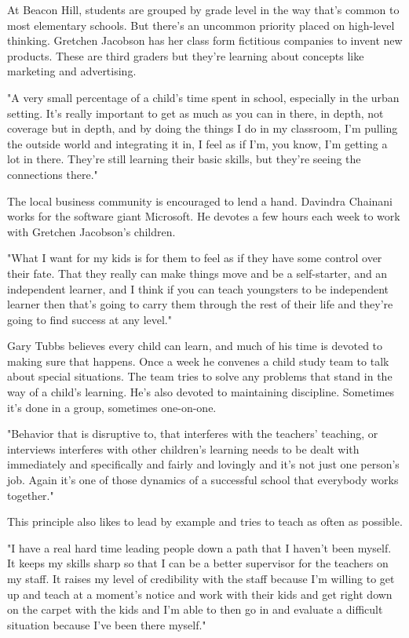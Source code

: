At Beacon Hill, students are grouped by grade level in the way that's common to most elementary schools. But there's an uncommon priority placed on high-level thinking. Gretchen Jacobson has her class form fictitious companies to invent new products. These are third graders but they're learning about concepts like marketing and advertising.

"A very small percentage of a child's time spent in school, especially in the urban setting. It's really important to get as much as you can in there, in depth, not coverage but in depth, and by doing the things I do in my classroom, I'm pulling the outside world and integrating it in, I feel as if I'm, you know, I'm getting a lot in there. They're still learning their basic skills, but they're seeing the connections there."

The local business community is encouraged to lend a hand. Davindra Chainani works for the software giant Microsoft. He devotes a few hours each week to work with Gretchen Jacobson's children.

"What I want for my kids is for them to feel as if they have some control over their fate. That they really can make things move and be a self-starter, and an independent learner, and I think if you can teach youngsters to be independent learner then that's going to carry them through the rest of their life and they're going to find success at any level."

Gary Tubbs believes every child can learn, and much of his time is devoted to making sure that happens. Once a week he convenes a child study team to talk about special situations. The team tries to solve any problems that stand in the way of a child's learning. He's also devoted to maintaining discipline. Sometimes it's done in a group, sometimes one-on-one.

"Behavior that is disruptive to, that interferes with the teachers' teaching, or interviews interferes with other children's learning needs to be dealt with immediately and specifically and fairly and lovingly and it's not just one person's job. Again it's one of those dynamics of a successful school that everybody works together."

This principle also likes to lead by example and tries to teach as often as possible.

"I have a real hard time leading people down a path that I haven't been myself. It keeps my skills sharp so that I can be a better supervisor for the teachers on my staff. It raises my level of credibility with the staff because I'm willing to get up and teach at a moment's notice and work with their kids and get right down on the carpet with the kids and I'm able to then go in and evaluate a difficult situation because I've been there myself."

